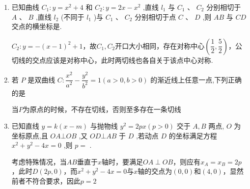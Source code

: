 \begin{enumerate}
\begin{jieda}
        设斜率存在时$M(x_0, y_0)$，因此对应的切线$AB$为$(x-5)(x_0 - 5)+yy_0 = r^2$，设$A(x_1, y_1), B(x_2, y_2)$，则有$\left\{\begin{array}{l}
             y_1^2 = 4x_1 \\
             y_2^2 = 4x_2
        \end{array}\right.$，两者作差有$(y_1^2 - y_2^2) = 4(x_1-x_2)$即$(y_1+y_2)(y_1 - y_2) = 4(x_1-x_2)$，故$k_{AB} = \dfrac{4}{y_1+y_2} = \dfrac{2}{y_0}$，根据方程$(x-5)(x_0 - 5)+yy_0 = r^2$可知$k_{AB} = \dfrac{5-x_0}{y_0}$，因此$x_0 = 3$

        故当圆上存在横坐标为$3$的点时会出现另外两条切线，但根据图象可知圆上横坐标为$3$的点应在抛物线内部才可以，即$r \in (2, 4)$
    \end{jieda}
    \item 已知曲线 ${C}_{1} : y = {x}^{2} + 4$ 和 ${C}_{2} : y = {2x} - {x}^{2}$ ,直线 ${l}_{1}$ 与 ${C}_{1}\text{ 、 }{C}_{2}$ 分别相切于 $A\text{ 、 }B$ ,直线 ${l}_{2}$ (不同于 ${l}_{1}$ )与 ${C}_{1}$ 、 ${C}_{2}$ 分别相切于点 $C$ 、 $D$ ,则 ${AB}$ 与 ${CD}$ 交点的横坐标是.
    \begin{jieda}
        $C_2: y = -(x-1)^2+1$，故$C_1, C_2$开口大小相同，存在对称中心$\left(\dfrac{1}{2}, \dfrac{5}{2}\right)$，公切线的交点应该是对称中心，此时两切线也各自关于该点中心对称.
    \end{jieda}
    \item 若 $P$ 是双曲线 $C : \dfrac{{x}^{2}}{{a}^{2}} - \dfrac{{y}^{2}}{{b}^{2}} = 1\left( {a > 0,b > 0}\right)$ 的渐近线上任意一点,下列正确的是
    \begin{jieda}
        当$P$为原点的时候，不存在切线，否则至多存在一条切线
    \end{jieda}
    \item 已知直线 $y = k\left( {x - m}\right)$ 与抛物线 ${y}^{2} = {2px}\left( {p > 0}\right)$ 交于 $A,B$ 两点, $O$ 为坐标原点,且 ${OA} \bot  {OB}$ ,又 ${OD} \bot  {AB}$ 于 $D$ ,若动点 $D$ 的坐标满足方程 ${x}^{2} + {y}^{2} - {4x} = 0$ ,则 $p = $ .
    \begin{jieda}
        考虑特殊情况，当$AB$垂直于$x$轴时，要满足$OA \perp OB$，则应有$x_A = x_B = 2p$，此时$D(2p, 0)$，而${x}^{2} + {y}^{2} - {4x} = 0$与$x$轴的交点为$(0, 0)$和$(4,0)$，显然前者不符合要求，因此$p = 2$


\end{jieda}
\end{enumerate}
